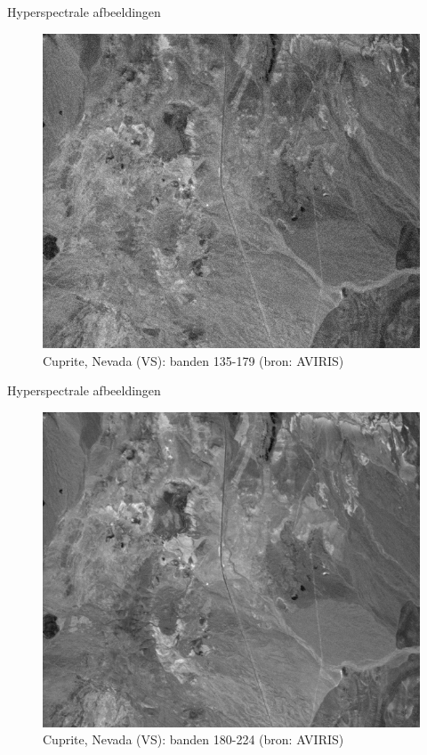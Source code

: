 \documentclass[t,12pt,dutch
\ifx\beamermode\undefined\else,\beamermode\fi
]{beamer}
\begin{document}
\begin{frame}{Hyperspectrale afbeeldingen}

\begin{figure}[H]
\centering
\includegraphics[scale=0.3]{images/cuprite_bands_135-179.png}
\caption{Cuprite, Nevada (VS): banden 135-179 (bron: AVIRIS)}
\end{figure}

\end{frame}

\begin{frame}{Hyperspectrale afbeeldingen}

\begin{figure}[H]
\centering
\includegraphics[scale=0.3]{images/cuprite_bands_180-224.png}
\caption{Cuprite, Nevada (VS): banden 180-224 (bron: AVIRIS)}
\end{figure}

\end{frame}
\end{document}
